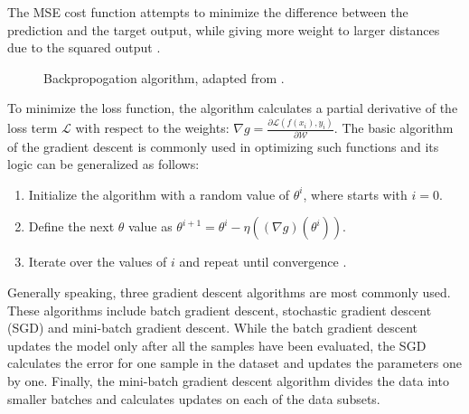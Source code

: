 The MSE cost function attempts to minimize the difference between the prediction and the target output, while giving more weight to larger distances due to the squared output \cite{Albarghouthi2021}.


\begin{figure}[htb]
    \centering
    \qquad
    \caption{Backpropogation algorithm, adapted from \cite{Alber2018}.}\label{fig:backprop}%
\end{figure}

To minimize the loss function, the algorithm calculates a partial derivative of the loss term $\mathcal{L}$ with respect to the weights: $\nabla g = \frac{\partial \mathcal{L}(f(x_i), y_i)}{\partial \mathcal{W}}$. The basic algorithm of the gradient descent is commonly used in optimizing such functions and its logic can be generalized as follows: 

\begin{enumerate}
  \item Initialize the algorithm with a random value of $\theta^{i}$, where starts with $i=0$.
  \item Define the next $\theta$ value as $\theta^{i+1} = \theta^{i}-\eta\left((\nabla g)\left(\theta^{i}\right)\right)$.
  \item Iterate over the values of $i$ and repeat until convergence \cite{Albarghouthi2021}.
\end{enumerate} 

Generally speaking, three gradient descent algorithms are most commonly used. These algorithms include batch gradient descent, stochastic gradient descent (SGD) and mini-batch gradient descent. While the batch gradient descent updates the model only after all the samples have been evaluated, the SGD calculates the error for one sample in the dataset and updates the parameters one by one. Finally, the mini-batch gradient descent algorithm divides the data into smaller batches and calculates updates on each of the data subsets. 

